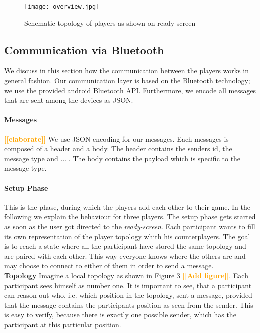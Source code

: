 \documentclass{report}
\newcommand{\todo}[1]{\textsf{\textbf{\textcolor{orange}{[[#1]]}}}}
\newcommand{\lfig}[1]{\label{fig:#1}}
\begin{document}
\begin{figure}[h]
	\centering
    \texttt{[image: overview.jpg]}
    \lfig{system-overview}
    \vspace{-5mm} %
	\caption{Schematic topology of players as shown on ready-screen}
\end{figure}

\subsection{Communication via Bluetooth} We discuss in this section how the communication between the players works in general fashion. Our communication layer is based on the Bluetooth technology; we use the provided android Bluetooth API. Furthermore, we encode all messages that are sent among the devices as JSON.

\paragraph{Messages}
\todo{elaborate}
We use JSON encoding for our messages. Each messages is composed of a header and a body. The header contains the senders id, the message type and ... . The body contains the payload which is specific to the message type.

\paragraph{Setup Phase}
This is the phase, during which the players add each other to their game. In the following we explain the behaviour for three players.  The setup phase gets started as soon as the user got directed to the \textit{ready-screen}. Each participant wants to fill its own representation of the player topology whith his counterplayers. The goal is to reach a state where all the participant have stored the same topology and are paired with each other. This way everyone knows where the others are and may choose to connect to either of them in order to send a message.\\

\textbf{Topology} Imagine a local topology as shown in Figure 3 \todo{Add figure}. Each participant sees himself as number one. It is important to see, that a participant can reason out who, i.e. which position in the topology, sent a message, provided that the message contains the participants position as seen from the sender. This is easy to verify, because there is exactly one possible sender, which has the participant at this particular position. 
\end{document}

